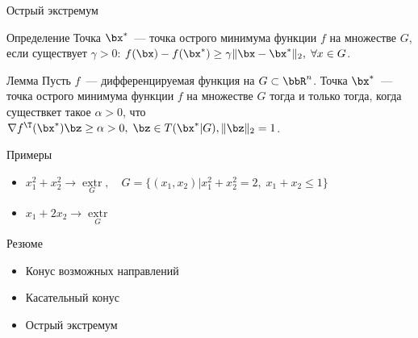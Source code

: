 \documentclass[12pt,russian]{beamer}
\DeclareMathOperator{\extr}{\mathrm{extr}}
\begin{document}
\begin{frame}{Острый экстремум}

\begin{block}{Определение}
Точка $\bx^*$~--- точка острого минимума функции $f$ на множестве $G$, если существует $\gamma > 0$: $f(\bx) - f(\bx^*) \geq \gamma \|\bx - \bx^*\|_2, \; \forall x \in G$. 
\end{block}

\begin{block}{Лемма}
Пусть $f$~--- дифференцируемая функция на $G \subset \bbR^n$. 
Точка $\bx^*$~--- точка острого минимума функции $f$ на множестве $G$ тогда и только тогда, когда существкет такое $\alpha > 0$, что $\nabla f^{\T}(\bx^*) \bz \geq \alpha > 0, \; \bz \in T(\bx^*|G), \| \bz \|_2 = 1$.
\end{block}

\begin{block}{Примеры}
\begin{itemize}
\item $x^2_1 + x^2_2 \rightarrow \extr\limits_{G}, \quad G = \{(x_1, x_2) | x^2_1 + x_2^2 = 2, \; x_1 + x_2 \leq 1 \}$
\item $x_1 + 2x_2 \rightarrow \extr\limits_{G}$
\end{itemize}
\end{block}

\end{frame}

\begin{frame}{Резюме}
\begin{itemize}
\item Конус возможных направлений
\item Касательный конус
\item Острый экстремум
\end{itemize}
\end{frame}
\end{document}

